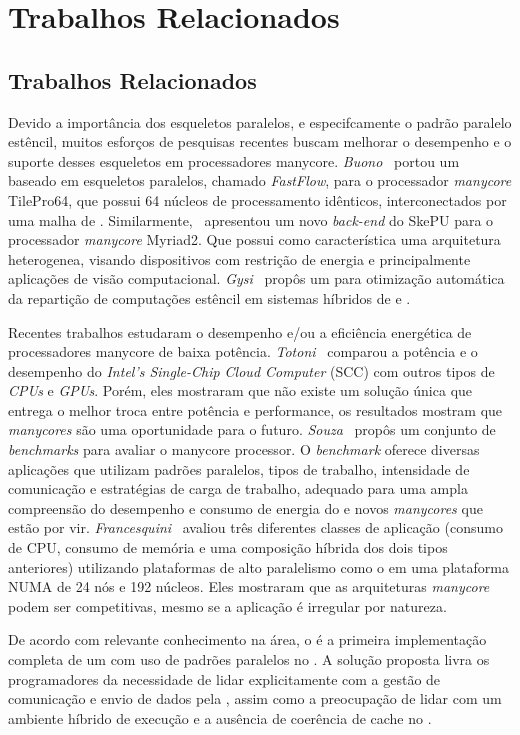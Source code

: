 \chapter[Trabalhos Relacionados]{Trabalhos Relacionados}


\section{Trabalhos Relacionados}

Devido a importância dos esqueletos paralelos, e especifcamente o padrão paralelo estêncil, muitos esforços de pesquisas recentes buscam melhorar o desempenho e o suporte desses esqueletos em processadores manycore. \textit{Buono}~\cite{buono13} portou um \fw baseado em esqueletos paralelos, chamado \textit{FastFlow}, para o processador \textit{manycore} TilePro64, que possui 64 núcleos de processamento idênticos, interconectados por uma malha de \noc. Similarmente,~\cite{thoraransen16} apresentou um novo \textit{back-end} do \fw SkePU para o processador \textit{manycore} Myriad2. Que possui como característica uma arquitetura heterogenea, visando dispositivos com restrição de energia e principalmente aplicações de visão computacional. \textit{Gysi}~\cite{gysi15} propôs um \fw para otimização automática da repartição de computações estêncil em sistemas híbridos de \cpu e \gpu.

Recentes trabalhos estudaram o desempenho e/ou a eficiência energética de processadores manycore de baixa potência. \textit{Totoni}~\cite{SCCEnergy:2012} comparou a potência e o desempenho do \textit{Intel's Single-Chip Cloud Computer} (SCC) com outros tipos de \textit{CPUs} e \textit{GPUs}. Porém, eles mostraram que não existe um solução única que entrega o melhor troca entre potência e performance, os resultados mostram que \textit{manycores} são uma oportunidade para o futuro. \textit{Souza}~\cite{Castro-Souza-CCPE:2016} propôs um conjunto de \textit{benchmarks} para avaliar o \mppa manycore processor. O \textit{benchmark} oferece diversas aplicações que utilizam padrões paralelos, tipos de trabalho, intensidade de comunicação e estratégias de carga de trabalho, adequado para uma ampla compreensão do desempenho e consumo de energia do \mppa e novos \textit{manycores} que estão por vir. \textit{Francesquini}~\cite{Castro-IA3-JPDC:2014} avaliou três diferentes classes de aplicação (consumo de CPU, consumo de memória e uma composição híbrida dos dois tipos anteriores) utilizando plataformas de alto paralelismo como o \mppa em uma plataforma NUMA de 24 nós e 192 núcleos. Eles mostraram que as arquiteturas \textit{manycore} podem ser competitivas, mesmo se a aplicação é irregular por natureza.

De acordo com relevante conhecimento na área, o \pskelmppa é a primeira implementação completa de um \fw com uso de padrões paralelos no \mppa. A solução proposta livra os programadores da necessidade de lidar explicitamente com a gestão de comunicação e envio de dados pela \noc, assim como a preocupação de lidar com um ambiente híbrido de execução e a ausência de coerência de cache no \mppa.